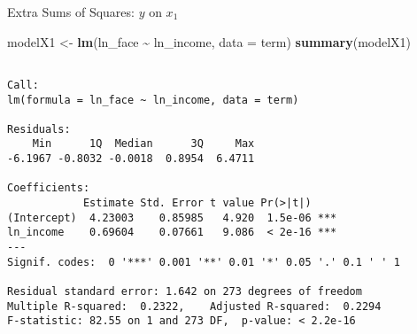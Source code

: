 \documentclass[
  ignorenonframetext,
]{beamer}
\newenvironment{Shaded}{\begin{snugshade}}{\end{snugshade}}
\newcommand{\AttributeTok}[1]{\textcolor[rgb]{0.13,0.29,0.53}{#1}}
\newcommand{\FunctionTok}[1]{\textcolor[rgb]{0.13,0.29,0.53}{\textbf{#1}}}
\newcommand{\NormalTok}[1]{#1}
\newcommand{\OtherTok}[1]{\textcolor[rgb]{0.56,0.35,0.01}{#1}}
\newcommand{\SpecialCharTok}[1]{\textcolor[rgb]{0.81,0.36,0.00}{\textbf{#1}}}
\begin{document}
\begin{frame}[fragile]{Extra Sums of Squares: \(y\) on \(x_1\)}
\protect\hypertarget{extra-sums-of-squares-y-on-x_1}{}
\footnotesize

\begin{Shaded}
\begin{Highlighting}[]
\NormalTok{modelX1 }\OtherTok{\textless{}{-}} \FunctionTok{lm}\NormalTok{(ln\_face }\SpecialCharTok{\textasciitilde{}}\NormalTok{ ln\_income, }\AttributeTok{data =}\NormalTok{ term)}
\FunctionTok{summary}\NormalTok{(modelX1)}
\end{Highlighting}
\end{Shaded}

\begin{verbatim}

Call:
lm(formula = ln_face ~ ln_income, data = term)

Residuals:
    Min      1Q  Median      3Q     Max 
-6.1967 -0.8032 -0.0018  0.8954  6.4711 

Coefficients:
            Estimate Std. Error t value Pr(>|t|)    
(Intercept)  4.23003    0.85985   4.920  1.5e-06 ***
ln_income    0.69604    0.07661   9.086  < 2e-16 ***
---
Signif. codes:  0 '***' 0.001 '**' 0.01 '*' 0.05 '.' 0.1 ' ' 1

Residual standard error: 1.642 on 273 degrees of freedom
Multiple R-squared:  0.2322,    Adjusted R-squared:  0.2294 
F-statistic: 82.55 on 1 and 273 DF,  p-value: < 2.2e-16
\end{verbatim}

\normalsize
\end{frame}
\end{document}
